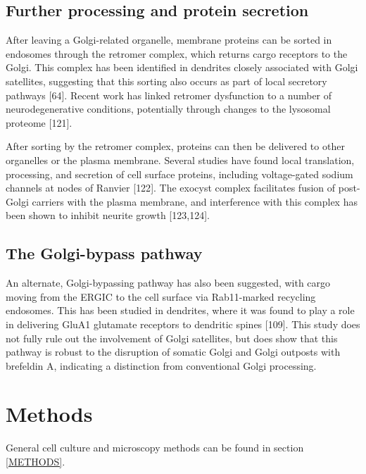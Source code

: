 \documentclass[
  12pt,
  a4paper,
]{book}
\begin{document}
\hypertarget{further-processing-and-protein-secretion}{%
\subsection{Further processing and protein secretion}\label{further-processing-and-protein-secretion}}

After leaving a Golgi-related organelle, membrane proteins can be sorted in endosomes through the retromer complex, which returns cargo receptors to the Golgi. This complex has been identified in dendrites closely associated with Golgi satellites, suggesting that this sorting also occurs as part of local secretory pathways {[}64{]}. Recent work has linked retromer dysfunction to a number of neurodegenerative conditions, potentially through changes to the lysosomal proteome {[}121{]}.

After sorting by the retromer complex, proteins can then be delivered to other organelles or the plasma membrane. Several studies have found local translation, processing, and secretion of cell surface proteins, including voltage-gated sodium channels at nodes of Ranvier {[}122{]}. The exocyst complex facilitates fusion of post-Golgi carriers with the plasma membrane, and interference with this complex has been shown to inhibit neurite growth {[}123,124{]}.

\hypertarget{the-golgi-bypass-pathway}{%
\subsection{The Golgi-bypass pathway}\label{the-golgi-bypass-pathway}}

An alternate, Golgi-bypassing pathway has also been suggested, with cargo moving from the ERGIC to the cell surface via Rab11-marked recycling endosomes. This has been studied in dendrites, where it was found to play a role in delivering GluA1 glutamate receptors to dendritic spines {[}109{]}. This study does not fully rule out the involvement of Golgi satellites, but does show that this pathway is robust to the disruption of somatic Golgi and Golgi outposts with brefeldin A, indicating a distinction from conventional Golgi processing.

\hypertarget{methods-2}{%
\section{Methods}\label{methods-2}}

General cell culture and microscopy methods can be found in section \ref{METHODS}.
\end{document}
